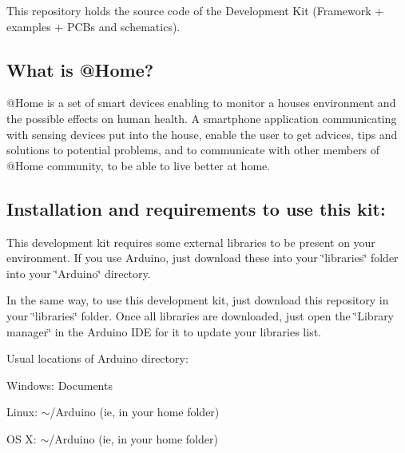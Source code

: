 This repository holds the source code of the  Development Kit (Framework + examples + P\+C\+Bs and schematics).

\subsection*{What is @Home?}

@Home is a set of smart devices enabling to monitor a house\textquotesingle{}s environment and the possible effects on human health. A smartphone application communicating with sensing devices put into the house, enable the user to get advices, tips and solutions to potential problems, and to communicate with other members of @Home community, to be able to live better at home.

\subsection*{Installation and requirements to use this kit\+:}

This development kit requires some external libraries to be present on your environment. If you use Arduino, just download these into your \char`\"{}libraries\char`\"{} folder into your \char`\"{}\+Arduino\char`\"{} directory.

In the same way, to use this development kit, just download this repository in your \char`\"{}libraries\char`\"{} folder. Once all libraries are downloaded, just open the \char`\"{}\+Library manager\char`\"{} in the Arduino I\+DE for it to update your libraries list.

Usual locations of Arduino directory\+:
\begin{DoxyItemize}
\item Windows\+: Documents
\item Linux\+: $\sim$/\+Arduino (ie, in your home folder)
\item OS X\+: $\sim$/\+Arduino (ie, in your home folder)
\end{DoxyItemize}


